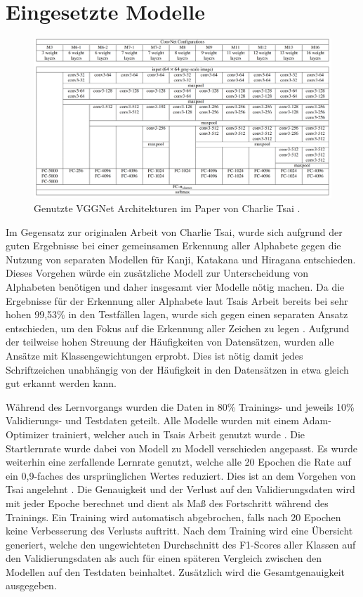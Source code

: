 \documentclass[twoside,a4paper]{IEEEtran}
\begin{document}
\section{Eingesetzte Modelle}
\begin{figure}[!htb]
	\centering
	\includegraphics[width=2.1\columnwidth]{conv_net_architectures}
	\caption{Genutzte VGGNet Architekturen im Paper von Charlie Tsai \cite[S.3]{RHC}.}
	\label{vggnet}
\end{figure}
Im Gegensatz zur originalen Arbeit von Charlie Tsai, wurde sich aufgrund der guten Ergebnisse bei einer gemeinsamen Erkennung aller Alphabete gegen die Nutzung von separaten Modellen für Kanji, Katakana und Hiragana entschieden. Dieses Vorgehen würde ein zusätzliche Modell zur Unterscheidung von Alphabeten benötigen und daher insgesamt vier Modelle nötig machen. Da die Ergebnisse für der Erkennung aller Alphabete laut Tsais Arbeit bereits bei sehr hohen 99,53\% in den Testfällen lagen, wurde sich gegen einen separaten Ansatz entschieden, um den Fokus auf die Erkennung aller Zeichen zu legen \cite[S.4-6]{RHC}. Aufgrund der teilweise hohen Streuung der Häufigkeiten von Datensätzen, wurden alle Ansätze mit Klassengewichtungen erprobt. Dies ist nötig damit jedes Schriftzeichen unabhängig von der Häufigkeit in den Datensätzen in etwa gleich gut erkannt werden kann.

Während des Lernvorgangs wurden die Daten in 80\% Trainings- und jeweils 10\% Validierungs- und Testdaten geteilt. Alle Modelle wurden mit einem Adam-Optimizer trainiert, welcher auch in Tsais Arbeit genutzt wurde \cite[S.4]{RHC}. Die Startlernrate wurde dabei von Modell zu Modell verschieden angepasst. Es wurde weiterhin eine zerfallende Lernrate genutzt, welche alle 20 Epochen die Rate auf ein 0,9-faches des ursprünglichen Wertes reduziert. Dies ist an dem Vorgehen von Tsai angelehnt \cite[S.4]{RHC}. Die Genauigkeit und der Verlust auf den Validierungsdaten wird mit jeder Epoche berechnet und dient als Maß des Fortschritt während des Trainings. Ein Training wird automatisch abgebrochen, falls nach 20 Epochen keine Verbesserung des Verlusts auftritt. Nach dem Training wird eine Übersicht generiert, welche den ungewichteten Durchschnitt des F1-Scores aller Klassen auf den Validierungsdaten als auch für einen späteren Vergleich zwischen den Modellen auf den Testdaten beinhaltet. Zusätzlich wird die Gesamtgenauigkeit ausgegeben.
\end{document}
